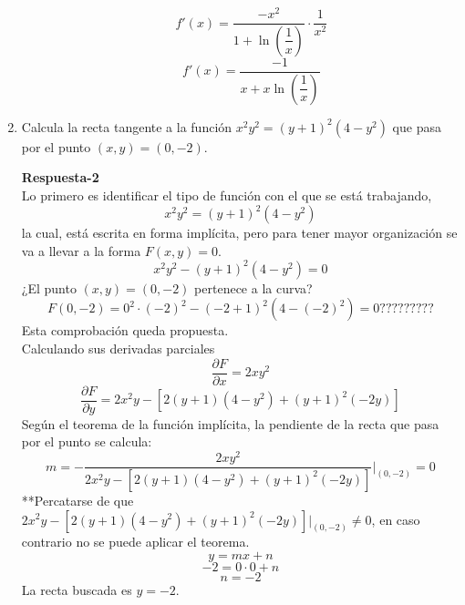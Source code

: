 \documentclass[10pt,twoside]{SelfArx} %
\begin{document}
\begin{enumerate}
\begin{enumerate}
	
	\[ f'(x)=\dfrac{-x^{2}}{1+\ln \left (\dfrac{1}{x} \right )}\cdot\dfrac{1}{x^{2}} \]
	\[ f'(x)=\dfrac{-1}{x+x\ln \left (\dfrac{1}{x} \right )} \]
	
	
	
	
\end{enumerate}
	
	\item	Calcula la recta tangente a la funci\'on $ x^{2}y^{2}=(y+1)^{2}(4-y^{2}) $ que pasa por el punto $ (x,y)=(0,-2) $.

\textbf{Respuesta-2}\\

Lo primero es identificar el tipo de función con el que se está trabajando,
\[ x^{2}y^{2}=(y+1)^{2}(4-y^{2}) \]
la cual, está escrita en forma implícita, pero para tener mayor organización se va a llevar a la forma $ F(x,y)=0 $.
\[ x^{2}y^{2}-(y+1)^{2}(4-y^{2})=0 \]
¿El punto $ (x,y)=(0,-2) $ pertenece a la curva?
\[ F(0,-2)=0^{2}\cdot(-2)^{2}-(-2+1)^{2}(4-(-2)^{2})=0????????? \]
Esta comprobación queda propuesta.\\
Calculando sus derivadas parciales
\[ \dfrac{\partial F}{\partial x}=2xy^{2} \]
\[ \dfrac{\partial F}{\partial y}=2x^{2}y-[2(y+1)(4-y^{2})+(y+1)^{2}(-2y)] \]
Según el teorema de la función implícita, la pendiente de la recta que pasa por el punto se calcula:\\
\[ m=- \dfrac{2xy^{2}}{2x^{2}y-[2(y+1)(4-y^{2})+(y+1)^{2}(-2y)]}\Bigg|_{(0,-2)}=0\]
**Percatarse de que  $ 2x^{2}y-[2(y+1)(4-y^{2})+(y+1)^{2}(-2y)]\Bigg|_{(0,-2)}\neq0 $, en caso contrario no se puede aplicar el teorema.
\[ y=mx+n \]
\[ -2=0\cdot0+n \]
\[ n=-2 \]
La recta buscada es $ y=-2 $.






\end{enumerate}
\end{document}
